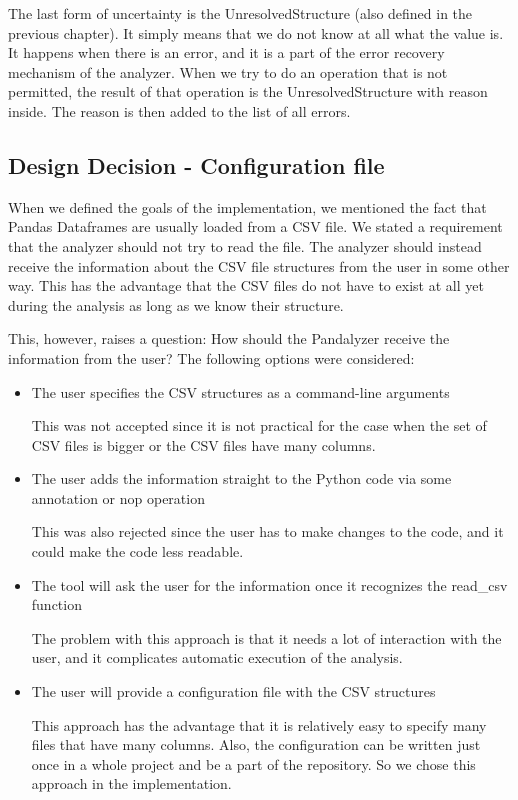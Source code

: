 The last form of uncertainty is the UnresolvedStructure (also defined in the previous chapter).
It simply means that we do not know at all what the value is.
It happens when there is an error, and it is a part of the error recovery mechanism of the analyzer.
When we try to do an operation that is not permitted, the result of that operation is the UnresolvedStructure with
reason inside.
The reason is then added to the list of all errors.




\subsection{Design Decision - Configuration file}\label{subsec:configuration-file}

When we defined the goals of the implementation, we mentioned the fact that Pandas Dataframes are usually loaded
from a CSV file.
We stated a requirement that the analyzer should not try to read the file.
The analyzer should instead receive the information about the CSV file structures from the user in some other way.
This has the advantage that the CSV files do not have to exist at all yet during the analysis as long as we know their
structure.

This, however, raises a question: How should the Pandalyzer receive the information from the user?
The following options were considered:
\begin{itemize}
    \item The user specifies the CSV structures as a command-line arguments

    This was not accepted since it is not practical for the case when the set of CSV files is bigger or the CSV files
    have many columns.

    \item The user adds the information straight to the Python code via some annotation or nop operation

    This was also rejected since the user has to make changes to the code, and it could make the code less readable.

    \item The tool will ask the user for the information once it recognizes the read\_csv function

    The problem with this approach is that it needs a lot of interaction with the user, and it complicates automatic
    execution of the analysis.

    \item The user will provide a configuration file with the CSV structures

    This approach has the advantage that it is relatively easy to specify many files that have many columns.
    Also, the configuration can be written just once in a whole project and be a part of the repository.
    So we chose this approach in the implementation.
\end{itemize}

